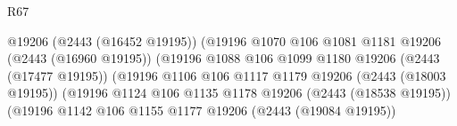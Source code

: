 \begin{lexlean}{R67}
\begin{coremodule}
                                                          @19206
                                                          (@2443 (@16452 @19195))
                                                          (@19196
                                                            @1070
                                                            @106
                                                            @1081
                                                            @1181
                                                            @19206
                                                            (@2443 (@16960 @19195))
                                                            (@19196
                                                              @1088
                                                              @106
                                                              @1099
                                                              @1180
                                                              @19206
                                                              (@2443 (@17477 @19195))
                                                              (@19196
                                                                @1106
                                                                @106
                                                                @1117
                                                                @1179
                                                                @19206
                                                                (@2443 (@18003 @19195))
                                                                (@19196
                                                                  @1124
                                                                  @106
                                                                  @1135
                                                                  @1178
                                                                  @19206
                                                                  (@2443 (@18538 @19195))
                                                                  (@19196
                                                                    @1142
                                                                    @106
                                                                    @1155
                                                                    @1177
                                                                    @19206
                                                                    (@2443 (@19084 @19195))

\end{coremodule}
\end{lexlean}
